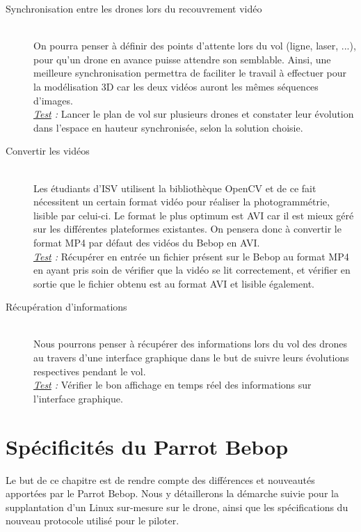 \documentclass[12pt, openany]{report}
\begin{document}
\begin{description} 
\item[Synchronisation entre les drones lors du recouvrement vidéo] \hfill \\
On pourra penser à définir des points d'attente lors du vol (ligne, laser, ...), pour qu'un drone en avance puisse attendre son semblable. Ainsi, une meilleure synchronisation permettra de faciliter le travail à effectuer pour la modélisation 3D car les deux vidéos auront les mêmes séquences d'images. \\
\textit{\underline{Test} :} Lancer le plan de vol sur plusieurs drones et constater leur évolution dans l'espace en hauteur synchronisée, selon la solution choisie.

\item[Convertir les vidéos] \hfill \\
Les étudiants d'ISV utilisent la bibliothèque OpenCV et de ce fait nécessitent un certain format vidéo pour réaliser la photogrammétrie, lisible par celui-ci. Le format le plus optimum est AVI car il est mieux géré sur les différentes plateformes existantes. On pensera donc à convertir le format MP4 par défaut des vidéos du Bebop en AVI. \\
\textit{\underline{Test} :} Récupérer en entrée un fichier présent sur le Bebop au format MP4 en ayant pris soin de vérifier que la vidéo se lit correctement, et vérifier en sortie que le fichier obtenu est au format AVI et lisible également.

\item[Récupération d'informations] \hfill \\
Nous pourrons penser à récupérer des informations lors du vol des drones au travers d'une interface graphique dans le but de suivre leurs évolutions respectives pendant le vol.\\
\textit{\underline{Test} :} Vérifier le bon affichage en temps réel des informations sur l'interface graphique.
\end{description}

\chapter{Spécificités du Parrot Bebop}
Le but de ce chapitre est de rendre compte des différences et nouveautés apportées par le Parrot Bebop. Nous y détaillerons la démarche suivie pour la supplantation d'un Linux sur-mesure sur le drone, ainsi que les spécifications du nouveau protocole utilisé pour le piloter.
\end{document}
